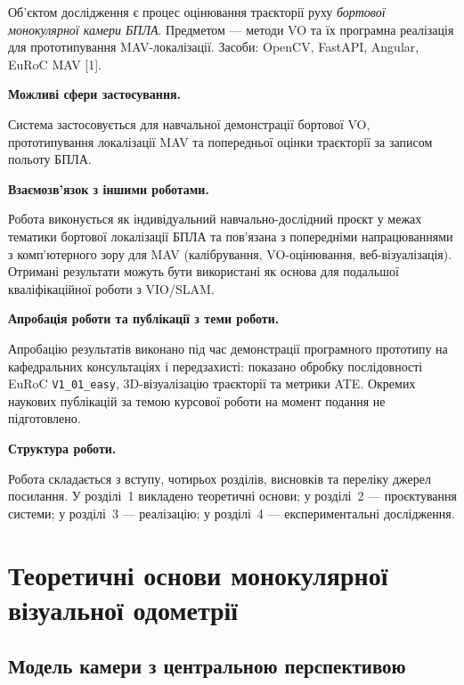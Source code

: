 \documentclass[14pt,a4paper,openany]{extreport}
\newcommand{\introheading}[1]{%
  \par\addvspace{0.5\baselineskip}%
  \noindent\textbf{#1}\par
}
\begin{document}
Об'єктом дослідження є процес оцінювання траєкторії руху \emph{бортової монокулярної камери БПЛА}. Предметом --- методи VO та їх програмна реалізація для прототипування MAV-локалізації. Засоби: OpenCV, FastAPI, Angular, EuRoC MAV [1].

\introheading{Можливі сфери застосування.}

Система застосовується для навчальної демонстрації бортової VO, прототипування локалізації MAV та попередньої оцінки траєкторії за записом польоту БПЛА.

\introheading{Взаємозв'язок з іншими роботами.}

Робота виконується як індивідуальний навчально-дослідний проєкт у межах тематики бортової локалізації БПЛА та пов'язана з попередніми напрацюваннями з комп'ютерного зору для MAV (калібрування, VO-оцінювання, веб-візуалізація). Отримані результати можуть бути використані як основа для подальшої кваліфікаційної роботи з VIO/SLAM.

\introheading{Апробація роботи та публікації з теми роботи.}

Апробацію результатів виконано під час демонстрації програмного прототипу на кафедральних консультаціях і передзахисті: показано обробку послідовності EuRoC \texttt{V1\_01\_easy}, 3D-візуалізацію траєкторії та метрики ATE. Окремих наукових публікацій за темою курсової роботи на момент подання не підготовлено.

\introheading{Структура роботи.}

Робота складається з вступу, чотирьох розділів, висновків та переліку джерел посилання. У розділі~1 викладено теоретичні основи; у розділі~2 --- проєктування системи; у розділі~3 --- реалізацію; у розділі~4 --- експериментальні дослідження.

\chapter{Теоретичні основи монокулярної візуальної одометрії}

\section{Модель камери з центральною перспективою}
\end{document}
